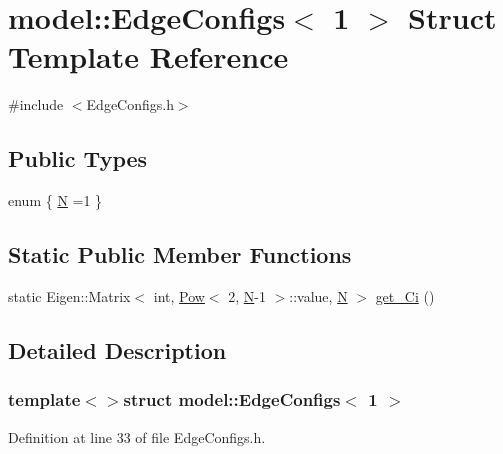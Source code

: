 \hypertarget{structmodel_1_1_edge_configs_3_011_01_4}{}\section{model\+:\+:Edge\+Configs$<$ 1 $>$ Struct Template Reference}
\label{structmodel_1_1_edge_configs_3_011_01_4}


{\ttfamily \#include $<$Edge\+Configs.\+h$>$}

\subsection*{Public Types}
\begin{DoxyCompactItemize}
\item 
enum \{ \hyperlink{structmodel_1_1_edge_configs_3_011_01_4_aeb056aec502469c8b5985715626ae078af788c0bec27047cd38dac99ad1af9639}{N} =1
 \}
\end{DoxyCompactItemize}
\subsection*{Static Public Member Functions}
\begin{DoxyCompactItemize}
\item 
static Eigen\+::\+Matrix$<$ int, \hyperlink{structmodel_1_1_pow}{Pow}$<$ 2, \hyperlink{structmodel_1_1_edge_configs_3_011_01_4_aeb056aec502469c8b5985715626ae078af788c0bec27047cd38dac99ad1af9639}{N}-\/1 $>$\+::value, \hyperlink{structmodel_1_1_edge_configs_3_011_01_4_aeb056aec502469c8b5985715626ae078af788c0bec27047cd38dac99ad1af9639}{N} $>$ \hyperlink{structmodel_1_1_edge_configs_3_011_01_4_a904a468d174e62c1f86b9d9fdc78c325}{get\+\_\+\+Ci} ()
\end{DoxyCompactItemize}


\subsection{Detailed Description}
\subsubsection*{template$<$$>$struct model\+::\+Edge\+Configs$<$ 1 $>$}



Definition at line 33 of file Edge\+Configs.\+h.




